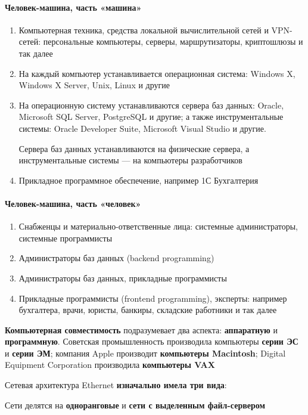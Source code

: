 \documentclass{article}
\begin{document}
\begin{minipage}[t]{0.45\textwidth}
\paragraph{Человек-машина, часть «машина»}

\begin{enumerate}
	\item Компьютерная техника, средства локальной вычислительной сетей и VPN-сетей: персональные компьютеры, серверы, маршрутизаторы, криптошлюзы и так далее
	\item На каждый компьютер устанавливается операционная система: Windows X, Windows X Server, Unix, Linux и другие
	\item На операционную систему устанавливаются сервера баз данных: Oracle, Microsoft SQL Server, PostgreSQL и другие; а также инструментальные системы: Oracle Developer Suite, Microsoft Visual Studio и другие.

	Сервера баз данных устанавливаются на физические сервера, а инструментальные системы — на компьютеры разработчиков
	\item Прикладное программное обеспечение, например 1С Бухгалтерия
\end{enumerate}
\end{minipage}%
\hfill
\begin{minipage}[t]{0.45\textwidth}
\paragraph{Человек-машина, часть «человек»}

\begin{enumerate}
	\item Снабженцы и материально-ответственные лица: системные администраторы, системные программисты
	\item Администраторы баз данных (backend programming)
	\item Администраторы баз данных, прикладные программисты
	\item Прикладные программисты (frontend programming), эксперты: например бухгалтера, врачи, юристы, банкиры, складские работники и так далее
\end{enumerate}
\end{minipage}

\hfill

\textbf{Компьютерная совместимость} подразумевает два аспекта: \textbf{аппаратную} и \textbf{программную}. Советская промышленность производила компьютеры \textbf{серии ЭС} и \textbf{серии ЭМ}; компания Apple производит \textbf{компьютеры Macintosh}; Digital Equipment Corporation производила \textbf{компьютеры VAX}

\hfill

Сетевая архитектура Ethernet \textbf{изначально имела три вида}:

\begin{multienumerate}
\end{multienumerate}

Сети делятся на \textbf{одноранговые} и \textbf{сети с выделенным файл-сервером}
\end{document}
